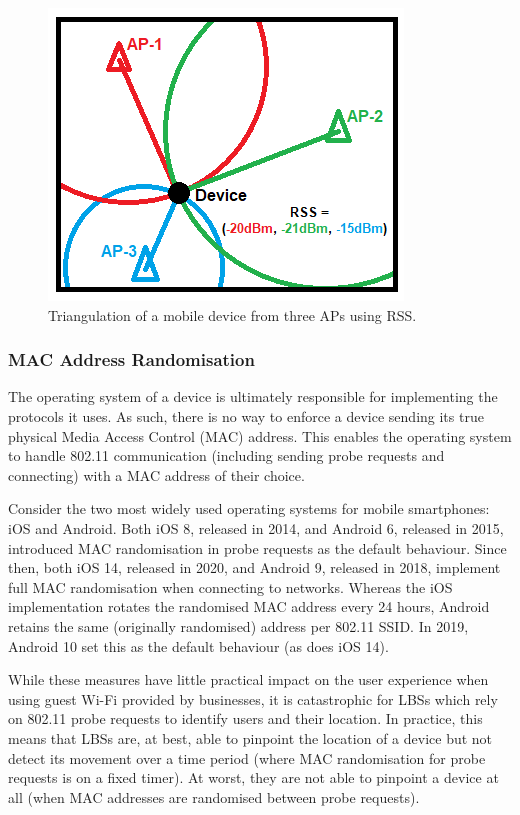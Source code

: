 \begin{figure}[!ht]
    \centering
    \includegraphics[scale=0.4]{figures/triangulation.png}
    \caption{Triangulation of a mobile device from three APs using RSS.}
    \label{fig:triangulation}
\end{figure}

\subsubsection{MAC Address Randomisation}\label{sec:mac-randomisation}

The operating system of a device is ultimately responsible for implementing the protocols it uses.
As such, there is no way to enforce a device sending its true physical Media Access Control (MAC) address.
This enables the operating system to handle 802.11 communication (including sending probe requests and connecting) with a MAC address of their choice.

Consider the two most widely used operating systems for mobile smartphones: iOS and Android.
Both iOS 8, released in 2014, and Android 6, released in 2015, introduced MAC randomisation in probe requests as the default behaviour.
Since then, both iOS 14, released in 2020, and Android 9, released in 2018, implement full MAC randomisation when connecting to networks.
Whereas the iOS implementation rotates the randomised MAC address every 24 hours, Android retains the same (originally randomised) address per 802.11 SSID\@.
In 2019, Android 10 set this as the default behaviour (as does iOS 14).

While these measures have little practical impact on the user experience when using guest Wi-Fi provided by businesses, it is catastrophic for LBSs which rely on 802.11 probe requests to identify users and their location.
In practice, this means that LBSs are, at best, able to pinpoint the location of a device but not detect its movement over a time period (where MAC randomisation for probe requests is on a fixed timer).
At worst, they are not able to pinpoint a device at all (when MAC addresses are randomised between probe requests).

